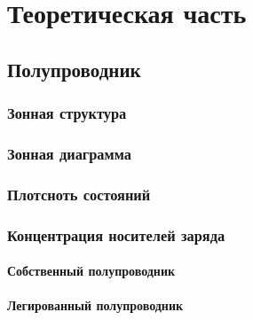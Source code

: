\chapter{Теоретическая часть}
\section{Полупроводник}
\subsection{Зонная структура}
\subsection{Зонная диаграмма}
\subsection{Плотсноть состояний}
\subsection{Концентрация носителей заряда}
\subsubsection{Собственный полупроводник}
\subsubsection{Легированный полупроводник}